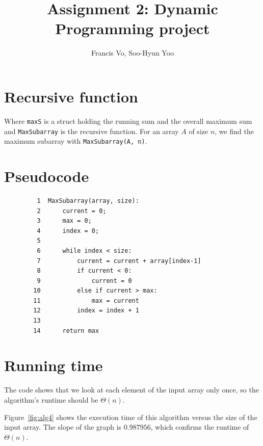 \documentclass[a4paper,10pt]{article}
\title{Assignment 2: Dynamic Programming project}
\author{Francis Vo, Soo-Hyun Yoo}
\begin{document}
	\maketitle

	\section{Recursive function}
		

		Where {\tt maxS} is a struct holding the running sum and the overall maximum sum and {\tt MaxSubarray} is the recursive function. For an array $A$ of size $n$, we find the maximum subarray with {\tt MaxSubarray(A, n)}.


	\section{Pseudocode}
		\begin{verbatim}
		 1  MaxSubarray(array, size):
		 2      current = 0;
		 3      max = 0;
		 4      index = 0;
		 5
		 6      while index < size:
		 7          current = current + array[index-1]
		 8          if current < 0:
		 9              current = 0
		10          else if current > max:
		11              max = current
		12          index = index + 1
		13
		14      return max
		\end{verbatim}


	\section{Running time}

		The code shows that we look at each element of the input array only once, so the algorithm's runtime should be $\Theta(n)$.

		Figure~\ref{fig:alg4} shows the execution time of this algorithm versus the size of the input array. The slope of the graph is $0.987956$, which confirms the runtime of $\Theta(n)$.
\end{document}
